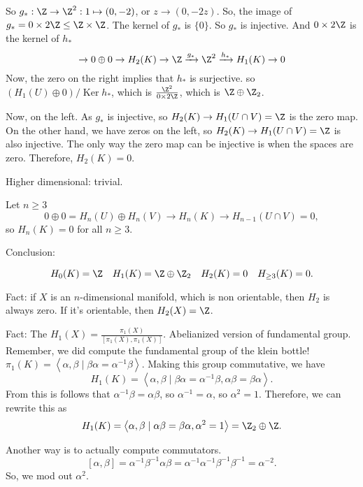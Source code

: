         So $g_*: \Z \to  \Z^2: 1 \mapsto (0, -2)$, or $z \to  (0, -2 z)$.
        So, the image of $g_* = 0 \times 2 \Z \le  \Z\times \Z$.
        The kernel of $g_*$ is $\{0\}$.
        So $g_*$ is injective.
        And $0 \times  2 \Z$ is the kernel of $h_*$
        \[
                    \to  0 \oplus 0 \to  H_2(K) \to  \Z \xrightarrow{g_*}   \Z^2 \xrightarrow{h_*}   H_1(K) \to  0
        \]
        Now, the zero on the right implies that $h_*$ is surjective.
        so $(H_1(U) \oplus 0) / \operatorname{Ker} h_*$, which is $\frac{\Z^2}{0 \times 2 \Z}$, which is $\Z \oplus \Z_2$.

        Now, on the left.
        As $g_*$ is injective, so $H_2(K) \to  H_1(U \cap V) = \Z$ is the zero map.
        On the other hand, we have zeros on the left, so $H_2(K) \to  H_1(U \cap V) = \Z$ is also injective.
        The only way the zero map can be injective is when the spaces are zero.
        Therefore, $H_2(K) = 0$.

        Higher dimensional: trivial.

        Let $n \ge  3$
        \[
            0 \oplus 0 = H_n(U) \oplus H_n(V) \to  H_n(K) \to H_{n-1}(U \cap V) = 0
        ,\] 
        so $H_n(K) = 0$ for all $n \ge  3$.

        Conclusion:

        \[
            H_0(K) = \Z \quad 
            H_1(K) = \Z \oplus \Z_2 \quad 
            H_2(K) = 0 \quad 
            H_{\ge 3}(K) = 0
        .\] 

        \begin{remark}
            Fact: if $X$ is an $n$-dimensional manifold, which is non orientable, then $H_2$ is always zero.
            If it's orientable, then  $H_2(X) = \Z$.
        \end{remark}

        \begin{remark}
            Fact: The $H_1(X) = \frac{\pi_1(X)}{[\pi_1(X), \pi_1(X)]}$.
            Abelianized version of fundamental group.
            Remember, we did compute the fundamental group of the klein bottle!
            $\pi_1(K) = \left<\alpha, \beta  \mid  \beta \alpha = \alpha^{-1} \beta \right>$.
            Making this group commutative, we have
            \[
                H_1(K) = \left<\alpha, \beta  \mid  \beta\alpha = \alpha^{-1} \beta, \alpha\beta = \beta\alpha \right>
            .\] 
            From this is follows that $\alpha^{-1} \beta = \alpha \beta$, so $\alpha^{-1} = \alpha$, so $\alpha^2 = 1$.
            Therefore, we can rewrite this as
            \[
                H_1(K) = \left<\alpha, \beta  \mid  \alpha\beta = \beta\alpha, \alpha^2 = 1 \right> = \Z_2 \oplus \Z
            .\] 

            Another way is to actually compute commutators.
            \[
                [\alpha, \beta] = \alpha^{-1}\beta^{-1} \alpha \beta = 
                \alpha^{-1} \alpha^{-1} \beta^{-1} \beta^{-1} = \alpha^{-2}
            .\] 
            So, we mod out $\alpha^2$.
        \end{remark}

